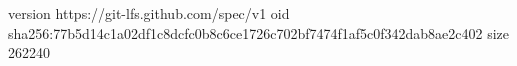 version https://git-lfs.github.com/spec/v1
oid sha256:77b5d14c1a02df1c8dcfc0b8c6ce1726c702bf7474f1af5c0f342dab8ae2c402
size 262240
